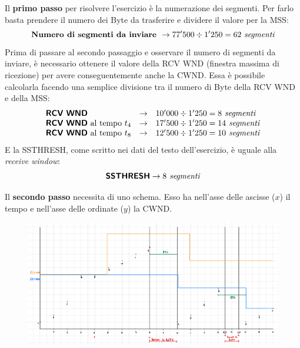 \documentclass[a4paper]{article}
\begin{document}
	\noindent
	Il \textbf{primo passo} per risolvere l'esercizio è la numerazione dei segmenti. Per farlo basta prendere il numero dei Byte da trasferire e dividere il valore per la \textsf{MSS}:
	\begin{equation*}
		\textbf{Numero di segmenti da inviare } \rightarrow 77'500 \div 1'250 = 62 \emph{ segmenti}
	\end{equation*}
	Prima di passare al secondo passaggio e osservare il numero di segmenti da inviare, è necessario ottenere il valore della \textsf{RCV WND} (finestra massima di ricezione) per avere conseguentemente anche la \textsf{CWND}. Essa è possibile calcolarla facendo una semplice divisione tra il numero di Byte della \textsf{RCV WND} e della \textsf{MSS}:
	\begin{equation*}
		\begin{array}{lll}
			\textbf{\textsf{RCV WND}} & \rightarrow & 10'000 \div 1'250 = 8 \emph{ segmenti} \\
			\textbf{\textsf{RCV WND}}\text{ al tempo }t_{4} & \rightarrow & 17'500 \div 1'250 = 14 \emph{ segmenti} \\
			\textbf{\textsf{RCV WND}}\text{ al tempo }t_{8} & \rightarrow & 12'500 \div 1'250 = 10 \emph{ segmenti}
		\end{array}
	\end{equation*}
	E la \textsf{SSTHRESH}, come scritto nei dati del testo dell'esercizio, è uguale alla \emph{receive window}:
	\begin{equation*}
		\textsf{\textbf{SSTHRESH}} \rightarrow 8 \emph{ segmenti}
	\end{equation*}\newpage
	
	\noindent
	Il \textbf{secondo passo} necessita di uno schema. Esso ha nell’asse delle ascisse ($x$) il tempo e nell’asse delle ordinate ($y$) la \textsf{CWND}.
	\begin{figure}[!htp]
		\centering
		\includegraphics[width=\textwidth]{img/ex5_congestione.pdf}
	\end{figure}
	
\end{document}
